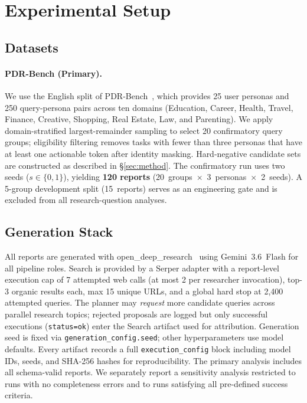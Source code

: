 \documentclass[]{article}
\begin{document}
\section{Experimental Setup}
\label{sec:setup}

\subsection{Datasets}

\paragraph{PDR-Bench (Primary).}
We use the English split of PDR-Bench~\cite{pdr-bench}, which provides 25 user personas and 250 query-persona pairs across ten domains (Education, Career, Health, Travel, Finance, Creative, Shopping, Real Estate, Law, and Parenting).
We apply domain-stratified largest-remainder sampling to select 20 confirmatory query groups; eligibility filtering removes tasks with fewer than three personas that have at least one actionable token after identity masking.
Hard-negative candidate sets are constructed as described in \S\ref{sec:method}.
The confirmatory run uses two seeds ($s \in \{0, 1\}$), yielding \textbf{120 reports} (20~groups~$\times$~3~personas~$\times$~2~seeds).
A 5-group development split (15~reports) serves as an engineering gate and is excluded from all research-question analyses.

\subsection{Generation Stack}

All reports are generated with open\_deep\_research~\cite{open-deep-research} using Gemini~3.6~Flash for all pipeline roles.
Search is provided by a Serper adapter with a report-level execution cap of 7
attempted web calls (at most 2 per researcher invocation), top-3 organic results
each, max 15 unique URLs, and a global hard stop at 2,400 attempted queries.
The planner may \emph{request} more candidate queries across parallel research
topics; rejected proposals are logged but only successful executions
(\texttt{status=ok}) enter the Search artifact used for attribution.
Generation seed is fixed via \texttt{generation\_config.seed}; other hyperparameters use model defaults.
Every artifact records a full \texttt{execution\_config} block including model IDs, seeds, and SHA-256 hashes for reproducibility.
The primary analysis includes all schema-valid reports.
We separately report a sensitivity analysis restricted to runs with no
completeness errors and to runs satisfying all pre-defined success criteria.
\end{document}

